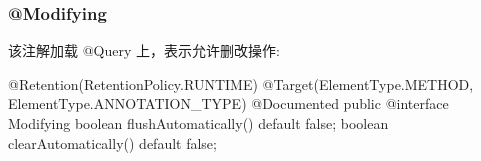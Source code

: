 \subsubsection{@Modifying}

该注解加载 @Query 上，表示允许删改操作:

\begin{Java}
@Retention(RetentionPolicy.RUNTIME)
@Target({ElementType.METHOD, ElementType.ANNOTATION_TYPE})
@Documented
public @interface Modifying {
    boolean flushAutomatically() default false;
    boolean clearAutomatically() default false;
}
\end{Java}

\newpage